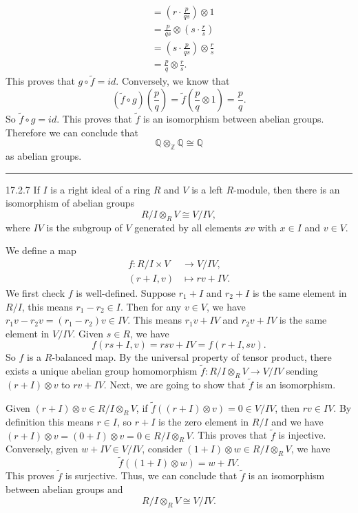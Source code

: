 \documentclass[a4paper, 12pt]{article}
\begin{document}
\begin{solution}
\begin{align*}
											  &=(r\cdot \frac{p}{qs})\otimes 1\\ 
											  &=\frac{p}{qs}\otimes (s\cdot \frac{r}{s})\\ 
											  &=(s\cdot \frac{p}{qs})\otimes \frac{r}{s}\\ 
											  &=\frac{p}{q}\otimes \frac{r}{s}.
\end{align*}
This proves that \(g\circ \tilde{f}=id\). Conversely, we know that 
\[(\tilde{f}\circ g)(\frac{p}{q})=\tilde{f}(\frac{p}{q}\otimes 1)=\frac{p}{q}.\]
So \(\tilde{f}\circ g=id\). This proves that \(\tilde{f}\) is an isomorphism between abelian groups. Therefore we can conclude that 
\[\mathbb{Q}\otimes_\mathbb{Z}\mathbb{Q}\cong \mathbb{Q}\]
as abelian groups.
\end{solution}

\noindent\rule{7in}{2.8pt}
\begin{problem}{17.2.7}
If \(I\) is a right ideal of a ring \(R\) and \(V\) is a left \(R\)-module, then there is an isomorphism of abelian groups 
\[R/I\otimes_R V\cong V/IV,\]
where \(IV\) is the subgroup of \(V\) generated by all elements \(xv\) with \(x\in I\) and \(v\in V\).
\end{problem}
\begin{solution}
We define a map 
\begin{align*}
	f:R/I\times V&\rightarrow V/IV,\\ 
	  (r+I,v)&\mapsto rv+IV.
\end{align*}
We first check \(f\) is well-defined. Suppose \(r_1+I\) and \(r_2+I\) is the same element in \(R/I\), this means \(r_1-r_2\in I\). Then for any \(v\in V\), we have 
\(r_1v-r_2v=(r_1-r_2)v\in IV\). This means \(r_1v+IV\) and \(r_2v+IV\) is the same element in \(V/IV\). Given \(s\in R\), we have 
\[f(rs+I,v)=rsv+IV=f(r+I,sv).\]
So \(f\) is a \(R\)-balanced map. By the universal property of tensor product, there exists a unique abelian group homomorphism \(\tilde{f}:R/I\otimes_R V\rightarrow V/IV\) sending 
\((r+I)\otimes v\) to \(rv+IV\). Next, we are going to show that \(\tilde{f}\) is an isomorphism. 

Given \((r+I)\otimes v\in R/I\otimes_R V\), if \(\tilde{f}((r+I)\otimes v)=0\in V/IV\), then \(rv\in IV\). By definition this means \(r\in I\), so \(r+I\) is the zero element in \(R/I\) and we have 
\((r+I)\otimes v=(0+I)\otimes v=0\in R/I\otimes_R V\). This proves that \(\tilde{f}\) is injective. Conversely, given \(w+IV\in V/IV\), consider \((1+I)\otimes w\in R/I\otimes_R V\), we have 
\[\tilde{f}((1+I)\otimes w)=w+IV.\]
This proves \(\tilde{f}\) is surjective. Thus, we can conclude that \(\tilde{f}\) is an isomorphism between abelian groups and 
\[R/I\otimes_R V\cong V/IV.\]
\end{solution}
\end{document}
